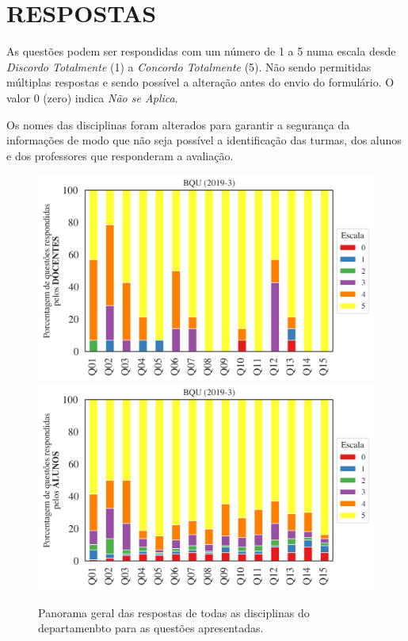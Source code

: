 \documentclass[a4paper,10pt]{article}
\begin{document}
\section{RESPOSTAS}
As questões podem ser respondidas com um número de 1 a 5 numa escala desde {\it Discordo Totalmente} (1) a {\it Concordo Totalmente} (5). Não sendo permitidas múltiplas respostas e sendo possível a alteração antes do envio do formulário. O valor 0 (zero) indica {\it Não se Aplica}.

Os nomes das disciplinas foram alterados para garantir a segurança da informações de modo que não seja possível a identificação das turmas, dos alunos  e dos professores que responderam a avaliação.

\begin{figure}[h]
\centering
\includegraphics[width=0.85\linewidth]{analise_geral_departamento_BQU_docentes.png}
\includegraphics[width=0.85\linewidth]{analise_geral_departamento_BQU_alunos.png}
\caption{\label{fig:analise_geral_departamento}            Panorama geral das respostas de todas as  disciplinas do departamenbto para as questões apresentadas.}
\end{figure}
\end{document}
